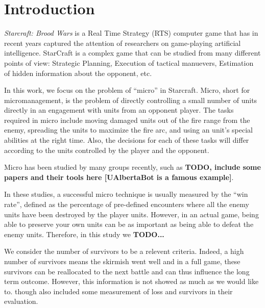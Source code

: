 \section{Introduction}\label{section:introduction}

\emph{Starcraft: Brood Wars} is a Real Time Strategy (RTS) computer
game that has in recent years captured the attention of researchers on
game-playing artificial intelligence. StarCraft is a complex game that
can be studied from many different points of view: Strategic Planning,
Execution of tactical manuevers, Estimation of hidden information
about the opponent, etc.

In this work, we focus on the problem of ``micro'' in
Starcraft. Micro, short for micromanagement, is the problem of
directly controlling a small number of units directly in an engagement
with units from an opponent player. The tasks required in micro
include moving damaged units out of the fire range from the enemy,
spreading the units to maximize the fire arc, and using an unit's
special abilities at the right time. Also, the decisions for each of
these tasks will differ according to the units controlled by the
player and the opponent.

Micro has been studied by many groups recently, such as {\bf TODO,
  include some papers and their tools here [UAlbertaBot is a famous example]}.

In these studies, a successful micro technique is usually measured by
the ``win rate'', defined as the percentage of pre-defined encounters
where all the enemy units have been destroyed by the player
units. However, in an actual game, being able to preserve your own
units can be as important as being able to defeat the enemy
units. Therefore, in this study we {\bf TODO...}



We consider the number of survivors to be a relevent criteria.
Indeed, a high number of survivors means the skirmish went well
and in a full game, these survivors can be reallocated to the
next battle and can thus influence the long term outcome.
However, this information is not showed as much as we would like to. \citet{SiSuBa14}
though also included some measurement of loss
and survivors in their evaluation.
